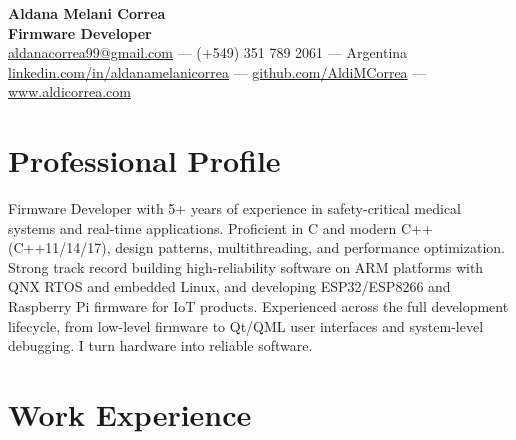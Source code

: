 \documentclass[11pt,a4paper]{article}
\begin{document}
\begin{center}
    {\LARGE\textbf{Aldana Melani Correa}}\\[4pt]
    {\large\textbf{Firmware Developer}}\\[6pt]
    \href{mailto:aldanacorrea99@gmail.com}{aldanacorrea99@gmail.com} --- (+549) 351 789 2061 --- Argentina\\[2pt]
    \href{https://linkedin.com/in/aldanamelanicorrea}{linkedin.com/in/aldanamelanicorrea} ---
    \href{https://github.com/AldiMCorrea}{github.com/AldiMCorrea} ---
    \href{https://www.aldicorrea.com}{www.aldicorrea.com}
\end{center}

\section{Professional Profile}
Firmware Developer with 5+ years of experience in safety-critical medical systems and real-time applications. Proficient in C and modern C++ (C++11/14/17), design patterns, multithreading, and performance optimization. Strong track record building high-reliability software on ARM platforms with QNX RTOS and embedded Linux, and developing ESP32/ESP8266 and Raspberry Pi firmware for IoT products. Experienced across the full development lifecycle, from low-level firmware to Qt/QML user interfaces and system-level debugging. I turn hardware into reliable software.

\section{Work Experience}
\end{document}
